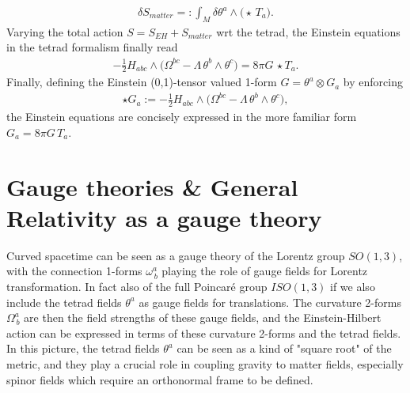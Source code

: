 \documentclass[../geometry_main.tex]{subfiles}
\begin{document}
\begin{align}
    \delta S_{matter}=:\int_M \delta\theta^a \wedge \big(\star\, T_a\big).
\end{align}
Varying the total action $S=S_{EH}+S_{matter}$ wrt the tetrad, the Einstein equations in the tetrad formalism finally read
\begin{align}
    -\tfrac12 H_{abc}\wedge \Big( \Omega^{bc} - \Lambda \,\theta^b \wedge \theta^c\Big) = 8\pi G\, \star T_a.
\end{align}
Finally, defining the Einstein (0,1)-tensor valued 1-form $G= \theta^a\otimes G_a$ by enforcing
\begin{align}
    \star G_a := -\tfrac12 H_{abc}\wedge \Big( \Omega^{bc} - \Lambda \,\theta^b \wedge \theta^c\Big),
\end{align}
the Einstein equations are concisely expressed in the more familiar form $G_a = 8\pi G\, T_a$.




\section{Gauge theories \& General Relativity as a gauge theory}
%
Curved spacetime can be seen as a gauge theory of the Lorentz group $SO(1,3)$, with the connection 1-forms $\omega^a_{\, b}$ playing the role of gauge fields for Lorentz transformation.
In fact also of the full Poincaré group $ISO(1,3)$ if we also include the tetrad fields $\theta^a$ as gauge fields for translations.
The curvature 2-forms $\Omega^a_{\, b}$ are then the field strengths of these gauge fields, and the Einstein-Hilbert action can be expressed in terms of these curvature 2-forms and the tetrad fields.
In this picture, the tetrad fields $\theta^a$ can be seen as a kind of "square root" of the metric, and they play a crucial role in coupling gravity to matter fields, especially spinor fields which require an orthonormal frame to be defined.
\end{document}
